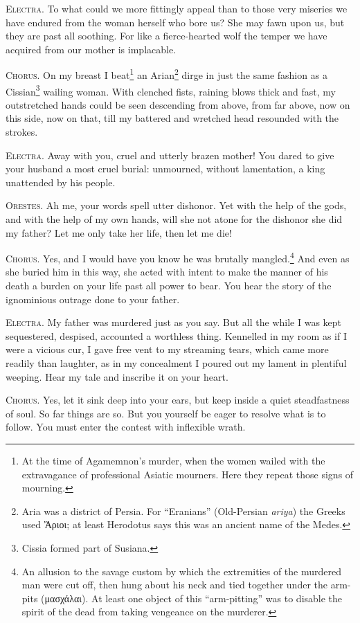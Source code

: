 \documentclass[12pt]{article}
\begin{document}
\textsc{Electra.} To what could we more fittingly appeal than to those very miseries we have endured from the woman herself who bore us? She may fawn upon us, but they are past all soothing. For like a fierce-hearted wolf the temper we have acquired from our mother is implacable.

\textsc{Chorus.} On my breast I beat\footnote{At the time of Agamemnon's murder, when the women wailed with the extravagance of professional Asiatic mourners. Here they repeat those signs of mourning.} an Arian\footnote{Aria was a district of Persia. For ``Eranians'' (Old-Persian \textit{ariya}) the Greeks used Ἄριοι; at least Herodotus says this was an ancient name of the Medes.} dirge in just the same fashion as a Cissian\footnote{Cissia formed part of Susiana.} wailing woman. With clenched fists, raining blows thick and fast, my outstretched hands could be seen descending from above, from far above, now on this side, now on that, till my battered and wretched head resounded with the strokes.

\textsc{Electra.} Away with you, cruel and utterly brazen mother! You dared to give your husband a most cruel burial: unmourned, without lamentation, a king unattended by his people.

\textsc{Orestes.} Ah me, your words spell utter dishonor. Yet with the help of the gods, and with the help of my own hands, will she not atone for the dishonor she did my father? Let me only take her life, then let me die!

\textsc{Chorus.} Yes, and I would have you know he was brutally mangled.\footnote{An allusion to the savage custom by which the extremities of the murdered man were cut off, then hung about his neck and tied together under the arm-pits (μασχάλαι). At least one object of this ``arm-pitting'' was to disable the spirit of the dead from taking vengeance on the murderer.} And even as she buried him in this way, she acted with intent to make the manner of his death a burden on your life past all power to bear. You hear the story of the ignominious outrage done to your father.

\textsc{Electra.} My father was murdered just as you say. But all the while I was kept sequestered, despised, accounted a worthless thing. Kennelled in my room as if I were a vicious cur, I gave free vent to my streaming tears, which came more readily than laughter, as in my concealment I poured out my lament in plentiful weeping. Hear my tale and inscribe it on your heart.

\textsc{Chorus.} Yes, let it sink deep into your ears, but keep inside a quiet steadfastness of soul. So far things are so. But you yourself be eager to resolve what is to follow. You must enter the contest with inflexible wrath.
\end{document}
